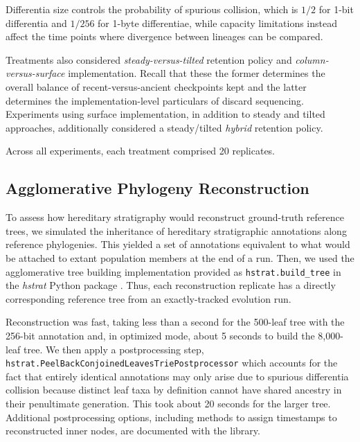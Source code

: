 Differentia size controls the probability of spurious collision, which is $1/2$ for 1-bit differentia and $1/256$ for 1-byte differentiae, while capacity limitations instead affect the time points where divergence between lineages can be compared.

Treatments also considered \textit{steady-versus-tilted} retention policy and \textit{column-versus-surface} implementation.
Recall that these the former determines the overall balance of recent-versus-ancient checkpoints kept and the latter determines the implementation-level particulars of discard sequencing.
Experiments using surface implementation, in addition to steady and tilted approaches, additionally considered a steady/tilted \textit{hybrid} retention policy.

Across all experiments, each treatment comprised 20 replicates.

\subsection{Agglomerative Phylogeny Reconstruction}

To assess how hereditary stratigraphy would reconstruct ground-truth reference trees, we simulated the inheritance of hereditary stratigraphic annotations along reference phylogenies.
This yielded a set of annotations equivalent to what would be attached to extant population members at the end of a run.
Then, we used the agglomerative tree building implementation provided as \texttt{hstrat.build\_tree} in the \textit{hstrat} Python package \citep{moreno2022hstrat}.
Thus, each reconstruction replicate has a directly corresponding reference tree from an exactly-tracked evolution run.

Reconstruction was fast, taking less than a second for the 500-leaf tree with the 256-bit annotation and, in optimized mode, about 5 seconds to build the 8,000-leaf tree.
We then apply a postprocessing step, \texttt{hstrat.{\allowbreak}Peel{\allowbreak}Back{\allowbreak}Conjoined{\allowbreak}Leave{\allowbreak}sTrie{\allowbreak}Postprocessor} which accounts for the fact that entirely identical annotations may only arise due to spurious differentia collision because distinct leaf taxa by definition cannot have shared ancestry in their penultimate generation.
This took about 20 seconds for the larger tree.
Additional postprocessing options, including methods to assign timestamps to reconstructed inner nodes, are documented with the library.

